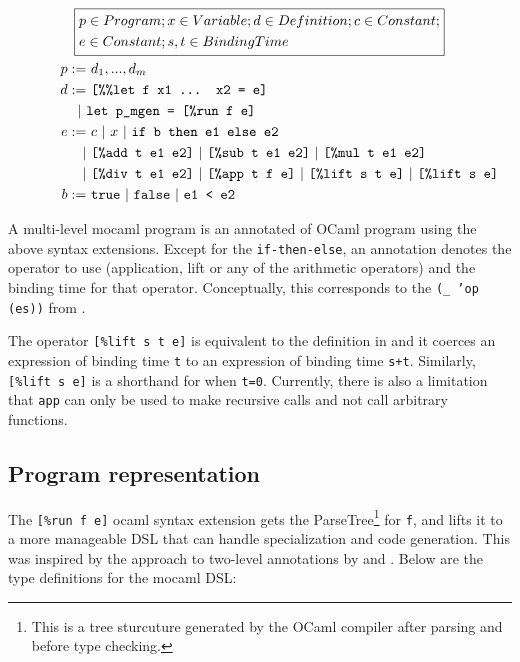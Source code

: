 \begin{gather*}  
  \boxed{    
    \begin{aligned}
      &p\in Program; x\in Variable; d\in Definition; c\in Constant;\\
      &e \in Constant; s,t \in BindingTime
    \end{aligned}
  }\\
  \hspace{1cm}
  \begin{align*}
    p :=&~d_1,...,d_m\\
    d :=&~\text{\texttt{[\%\%let f x1 ... x2 = e]}}\\
    |~& \text{\texttt{let p\_mgen = [\%run f e]}}\\
    e :=&~c ~|~x ~|~\text{\texttt{if b then e1 else e2}}\\
    |&~\text{\texttt{[\%add t e1 e2]}}
       ~|~\text{\texttt{[\%sub t e1 e2]}}
       ~|~\text{\texttt{[\%mul t e1 e2]}}\\
    |&~\text{\texttt{[\%div t e1 e2]}}
       ~|~\text{\texttt{[\%app t f e]}}
       ~|~\text{\texttt{[\%lift s t e]}}
       ~|~\text{\texttt{[\%lift s e]}}\\
    b :=&~\mathtt{true} ~|~\mathtt{false} ~|~\text{\texttt{e1 < e2}}
  \end{align*}
\end{gather*}

A multi-level mocaml program is an annotated of OCaml program using the above syntax extensions. Except for the \texttt{if-then-else}, an annotation denotes the operator to use (application, lift or any of the arithmetic operators) and the binding time for that operator. Conceptually, this corresponds to the \texttt{(\_ 'op (es))} from \cite{multilevel}.

The operator \texttt{[\%lift s t e]} is equivalent to the definition in \cite{multilevel} and it coerces an expression of binding time \texttt{t} to an expression of binding time \texttt{s+t}. Similarly, \texttt{[\%lift s e]} is a shorthand for when \texttt{t=0}. Currently, there is also a limitation that \texttt{app} can only be used to make recursive calls and not call arbitrary functions.

\subsection{Program representation}

The \texttt{[\%run f e]} ocaml syntax extension gets the ParseTree\footnote{This is a tree sturcuture generated by the OCaml compiler after parsing and before type checking.} for \texttt{f}, and lifts it to a more manageable DSL that can handle specialization and code generation. This was inspired by the approach to two-level annotations by \cite{metaML} and \cite{metaOCaml}. Below are the type definitions for the mocaml DSL:

